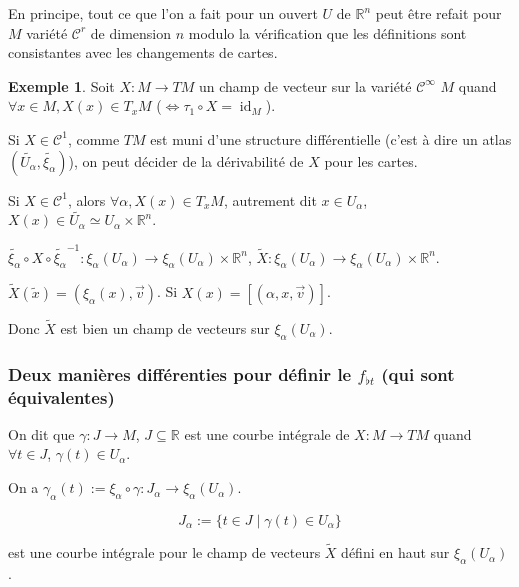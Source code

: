 \documentclass[french]{article}
\theoremstyle{definition}
\newtheorem{protoexemple}{Exemple}[section]
\newenvironment{exemple}
    {\colorlet{shadecolor}{gray!10}\begin{shaded}\begin{protoexemple}}
    {\end{protoexemple}\end{shaded}}
\begin{document}
En principe, tout ce que l'on a fait pour un ouvert \(U\) de \(\mathbb{R}^n\) peut être refait pour \(M\) variété \(\mathcal{C}^r\) de dimension \(n\) modulo la vérification que les définitions sont consistantes avec les changements de cartes.

\begin{exemple}
  Soit \(X : M \longrightarrow TM\) un champ de vecteur sur la variété \(\mathcal{C}^{\infty}\) \(M\) quand \(\forall x \in M, X(x)\in T_x M\) (\(\Leftrightarrow \tau_1 \circ X = \operatorname{id}_M\)).

  Si \(X \in \mathcal{C}^1\), comme \(TM\) est muni d'une structure différentielle (c'est à dire un atlas \((\widetilde{U _{\alpha}}, \widetilde{\xi _{\alpha}})\)), on peut décider de la dérivabilité de \(X\) pour les cartes.

  Si \(X \in \mathcal{C}^1\), alors \(\forall \alpha, X(x) \in T_x M\), autrement dit \(x \in U _{\alpha}\), \(X(x)\in \widetilde{U _{\alpha}} \simeq U _{\alpha}\times \mathbb{R}^n\).

  \(\widetilde{\xi_\alpha} \circ X \circ \widetilde{\xi _{\alpha}}^{-1} : \xi _{\alpha}(U _{\alpha}) \longrightarrow \xi _{\alpha}(U _{\alpha}) \times \mathbb{R}^n\), \(\widetilde{X} : \xi _{\alpha}(U _{\alpha}) \longrightarrow \xi _{\alpha}(U _{\alpha}) \times \mathbb{R}^n\).

  \(\widetilde{X}(\widetilde{x}) = (\xi_\alpha(x), \overrightarrow{v})\). Si \(X(x) = [(\alpha, x,\overrightarrow{v})]\).

  Donc \(\widetilde{X}\) est bien un champ de vecteurs sur \(\xi _{\alpha}(U _{\alpha})\).
\end{exemple}

\subsubsection{Deux manières différenties pour définir le \(f _{\flat t}\) (qui sont équivalentes)}

On dit que \(\gamma : J \longrightarrow M\), \(J \subseteq \mathbb{R}\) est une courbe intégrale de \(X : M \longrightarrow TM\) quand \(\forall t \in J\), \(\gamma(t) \in U _{\alpha}\).

On a \(\gamma _{\alpha}(t) := \xi _{\alpha}\circ \gamma : J _{\alpha} \longrightarrow \xi _{\alpha}(U _{\alpha})\).

\[J _{\alpha}:= \{ t \in J \mid \gamma(t)\in U _{\alpha} \}\]

est une courbe intégrale pour le champ de vecteurs \(\widetilde{X}\) défini en haut sur \(\xi _{\alpha}(U _{\alpha})\).
\end{document}
